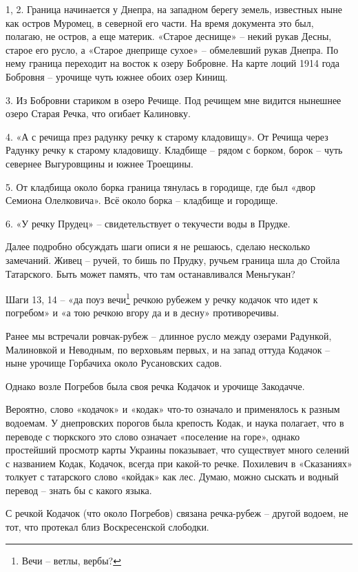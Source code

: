 1, 2. Граница начинается у Днепра, на западном берегу земель, известных ныне как остров Муромец, в северной его части. На время документа это был, полагаю, не остров, а еще материк. «Старое деснище» – некий рукав Десны, старое его русло, а «Старое днеприще сухое» – обмелевший рукав Днепра. По нему граница переходит на восток к озеру Бобровне. На карте лоций 1914 года Бобровня – урочище чуть южнее обоих озер Кинищ.

3. Из Бобровни стариком в озеро Речище. Под речищем мне видится нынешнее озеро Старая Речка, что огибает Калиновку.

4. «А с речища през радунку речку к старому кладовищу». От Речища через Радунку речку к старому кладовищу. Кладбище – рядом с борком, борок – чуть севернее Выгуровщины и южнее Троещины. 


5. От кладбища около борка граница тянулась в городище, где был «двор Семиона Олелковича». Всё около борка – кладбище и городище.

6. «У речку Прудец» – свидетельствует о текучести воды в Прудке.

Далее подробно обсуждать шаги описи я не решаюсь, сделаю несколько замечаний. Живец – ручей, то бишь по Прудку, ручьем граница шла до Стойла Татарского. Быть может память, что там останавливался Меньгукан?%

Шаги 13, 14 – «да поуз вечи\footnote{Вечи – ветлы, вербы?} речкою рубежем у речку кодачок что идет к погребом» и «а тою речкою вгору да и в десну» противоречивы.

Ранее мы встречали ровчак-рубеж – длинное русло между озерами Радункой, Малиновкой и Неводным, по верховьям первых, и на запад оттуда Кодачок – ныне урочище Горбачиха около Русановских садов.

Однако возле Погребов была своя речка Кодачок и урочище Закодачче.

Вероятно, слово «кодачок» и «кодак» что-то означало и применялось к разным водоемам. У днепровских порогов была крепость Кодак, и  наука полагает, что в переводе с тюркского это слово означает «поселение на горе», однако простейший просмотр карты Украины показывает, что существует много селений с названием Кодак, Кодачок, всегда при какой-то речке. Похилевич в «Сказаниях» толкует с татарского слово «койдак»  как лес. Думаю, можно сыскать и водный перевод – знать бы с какого языка. 

С речкой Кодачок (что около Погребов) связана речка-рубеж – другой водоем, не тот, что протекал близ Воскресенской слободки.

